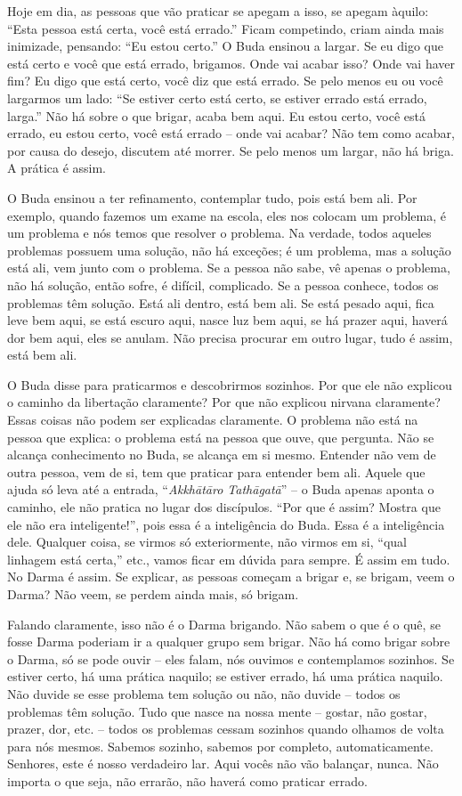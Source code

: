 Hoje em dia, as pessoas que vão praticar se apegam a isso, se apegam
àquilo: “Esta pessoa está certa, você está errado.” Ficam competindo,
criam ainda mais inimizade, pensando: “Eu estou certo.” O Buda ensinou
a largar. Se eu digo que está certo e você que está errado, brigamos.
Onde vai acabar isso? Onde vai haver fim? Eu digo que está certo, você
diz que está errado. Se pelo menos eu ou você largarmos um lado: “Se
estiver certo está certo, se estiver errado está errado, larga.” Não há
sobre o que brigar, acaba bem aqui. Eu estou certo, você está errado,
eu estou certo, você está errado – onde vai acabar? Não tem como
acabar, por causa do desejo, discutem até morrer. Se pelo menos um
largar, não há briga. A prática é assim. 

O Buda ensinou a ter refinamento, contemplar tudo, pois está bem
ali. Por exemplo, quando fazemos um exame na escola, eles nos colocam
um problema, é um problema e nós temos que resolver o problema. Na
verdade, todos aqueles problemas possuem uma solução, não há exceções;
é um problema, mas a solução está ali, vem junto com o problema. Se a
pessoa não sabe, vê apenas o problema, não há solução, então sofre, é
difícil, complicado. Se a pessoa conhece, todos os problemas têm
solução. Está ali dentro, está bem ali. Se está pesado aqui, fica leve
bem aqui, se está escuro aqui, nasce luz bem aqui, se há prazer aqui,
haverá dor bem aqui, eles se anulam. Não precisa procurar em outro
lugar, tudo é assim, está bem ali. 

O Buda disse para praticarmos e descobrirmos sozinhos. Por que ele
não explicou o caminho da libertação claramente? Por que não explicou
nirvana claramente? Essas coisas não podem ser explicadas claramente. O
problema não está na pessoa que explica: o problema está na pessoa que
ouve, que pergunta. Não se alcança conhecimento no Buda, se alcança em
si mesmo. Entender não vem de outra pessoa, vem de si, tem que praticar
para entender bem ali. Aquele que ajuda só leva até a entrada,
“\textit{Akkhātāro Tathāgatā}” – o Buda apenas aponta o
caminho, ele não pratica no lugar dos discípulos. “Por que é assim?
Mostra que ele não era inteligente!”, pois essa é a inteligência do
Buda. Essa é a inteligência dele. Qualquer coisa, se virmos só
exteriormente, não virmos em si, “qual linhagem está certa,” etc.,
vamos ficar em dúvida para sempre. É assim em tudo. No Darma é assim.
Se explicar, as pessoas começam a brigar e, se brigam, veem o Darma?
Não veem, se perdem ainda mais, só brigam. 

Falando claramente, isso não é o Darma brigando. Não sabem o que é o
quê, se fosse Darma poderiam ir a qualquer grupo sem brigar. Não há
como brigar sobre o Darma, só se pode ouvir – eles falam, nós ouvimos e
contemplamos sozinhos. Se estiver certo, há uma prática naquilo; se
estiver errado, há uma prática naquilo. Não duvide se esse problema tem
solução ou não, não duvide – todos os problemas têm solução. Tudo que
nasce na nossa mente – gostar, não gostar, prazer, dor, etc. – todos os
problemas cessam sozinhos quando olhamos de volta para nós mesmos.
Sabemos sozinho, sabemos por completo, automaticamente. Senhores, este
é nosso verdadeiro lar. Aqui vocês não vão balançar, nunca. Não importa
o que seja, não errarão, não haverá como praticar errado. 

